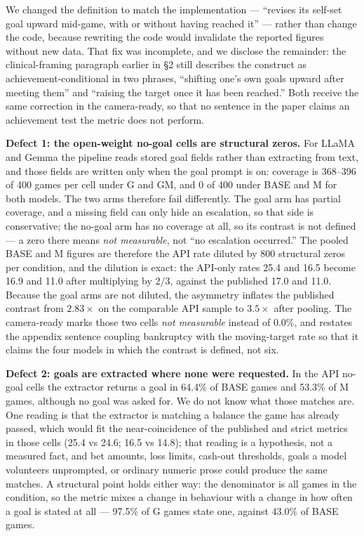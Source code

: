 We changed the definition to match the implementation --- ``revises its self-set goal upward
mid-game, with or without having reached it'' --- rather than change the code, because rewriting
the code would invalidate the reported figures without new data. That fix was incomplete, and we
disclose the remainder: the clinical-framing paragraph earlier in §2 still describes the
construct as achievement-conditional in two phrases, ``shifting one's own goals upward after
meeting them'' and ``raising the target once it has been reached.'' Both receive the same
correction in the camera-ready, so that no sentence in the paper claims an achievement test the
metric does not perform.

\textbf{Defect 1: the open-weight no-goal cells are structural zeros.} For LLaMA and Gemma the
pipeline reads stored goal fields rather than extracting from text, and those fields are written
only when the goal prompt is on: coverage is 368--396 of 400 games per cell under G and GM, and
0 of 400 under BASE and M for both models. The two arms therefore fail differently. The goal
arm has partial coverage, and a missing field can only hide an escalation, so that side is
conservative; the no-goal arm has no coverage at all, so its contrast is not defined --- a zero
there means \emph{not measurable}, not ``no escalation occurred.'' The pooled BASE and M figures are therefore the API rate diluted by 800
structural zeros per condition, and the dilution is exact: the API-only rates 25.4 and 16.5
become 16.9 and 11.0 after multiplying by $2/3$, against the published 17.0 and 11.0. Because
the goal arms are not diluted, the asymmetry inflates the published contrast from $2.83\times$
on the comparable API sample to $3.5\times$ after pooling. The camera-ready marks those two
cells \emph{not measurable} instead of 0.0\%, and restates the appendix sentence coupling
bankruptcy with the moving-target rate so that it claims the four models in which the contrast
is defined, not six.

\textbf{Defect 2: goals are extracted where none were requested.} In the API no-goal cells the
extractor returns a goal in 64.4\% of BASE games and 53.3\% of M games, although no goal was
asked for. We do not know what those matches are. One reading is that the extractor is matching
a balance the game has already passed, which would fit the near-coincidence of the published and
strict metrics in those cells (25.4 vs 24.6; 16.5 vs 14.8); that reading is a hypothesis, not a
measured fact, and bet amounts, loss limits, cash-out thresholds, goals a model volunteers
unprompted, or ordinary numeric prose could produce the same matches. A structural point holds
either way: the denominator is all games in the condition, so the metric mixes a change in
behaviour with a change in how often a goal is stated at all --- 97.5\% of G games state one,
against 43.0\% of BASE games.

